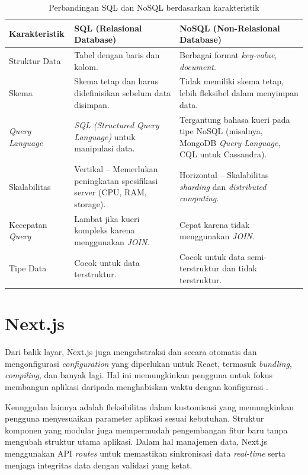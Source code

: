 \begin{table}[H]
    \centering
    \caption{Perbandingan SQL dan NoSQL berdasarkan karakteristik}
    \label{tab:sql_vs_nosql}
    \begin{tabular}{|l|p{5cm}|p{4cm}|}
        \hline
        \textbf{Karakteristik} & \textbf{SQL (Relasional Database)} & \textbf{NoSQL (Non-Relasional Database)} \\
        \hline
        Struktur Data & Tabel dengan baris dan kolom. & Berbagai format \textit{key-value}, \textit{document}. \\
        \hline
        Skema & Skema tetap dan harus didefinisikan sebelum data disimpan. & Tidak memiliki skema tetap, lebih fleksibel dalam menyimpan data. \\
        \hline
        \textit{Query Language} & \textit{SQL (Structured Query Language)} untuk manipulasi data. & Tergantung bahasa kueri pada tipe NoSQL (misalnya, MongoDB \textit{Query Language}, CQL untuk Cassandra). \\
        \hline
        Skalabilitas & Vertikal – Memerlukan peningkatan spesifikasi server (CPU, RAM, storage). & Horizontal – Skalabilitas \textit{sharding} dan \textit{distributed computing}. \\
        \hline
        Kecepatan \textit{Query} & Lambat jika kueri kompleks karena menggunakan \textit{JOIN}. & Cepat karena tidak menggunakan \textit{JOIN}. \\
        \hline
        Tipe Data & Cocok untuk data terstruktur. & Cocok untuk data semi-terstruktur dan tidak terstruktur. \\
        \hline
    \end{tabular}
\end{table}

\section{Next.js}
Dari balik layar, Next.js juga mengabstraksi dan secara otomatis dan mengonfigurasi \textit{configuration} yang diperlukan untuk React, termasuk \textit{bundling}, \textit{compiling}, dan banyak lagi. Hal ini memungkinkan pengguna untuk fokus membangun aplikasi daripada menghabiskan waktu dengan konfigurasi \parencite{nextjsdoc2025}.

Keunggulan lainnya adalah fleksibilitas dalam kustomisasi yang memungkinkan pengguna menyesuaikan parameter aplikasi sesuai kebutuhan. Struktur komponen yang modular juga mempermudah pengembangan fitur baru tanpa mengubah struktur utama aplikasi. Dalam hal manajemen data, Next.js menggunakan API \textit{routes} untuk memastikan sinkronisasi data \textit{real-time} serta menjaga integritas data dengan validasi yang ketat.

